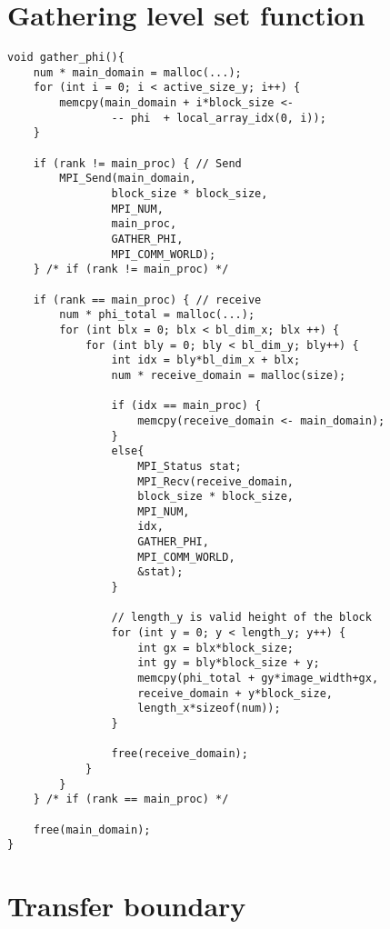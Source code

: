\section{Gathering level set function}
\label{apdx:gatherphi}
\begin{lstlisting}[caption=Gather phi]
void gather_phi(){
    num * main_domain = malloc(...);
    for (int i = 0; i < active_size_y; i++) {
        memcpy(main_domain + i*block_size <- 
                -- phi  + local_array_idx(0, i));
    }
    
    if (rank != main_proc) { // Send
        MPI_Send(main_domain,
                block_size * block_size,
                MPI_NUM,
                main_proc,
                GATHER_PHI,
                MPI_COMM_WORLD);
    } /* if (rank != main_proc) */
    
    if (rank == main_proc) { // receive
        num * phi_total = malloc(...);
        for (int blx = 0; blx < bl_dim_x; blx ++) {
            for (int bly = 0; bly < bl_dim_y; bly++) {
                int idx = bly*bl_dim_x + blx;
                num * receive_domain = malloc(size);
                
                if (idx == main_proc) {
                    memcpy(receive_domain <- main_domain);
                }
                else{
                    MPI_Status stat;
                    MPI_Recv(receive_domain,
                    block_size * block_size,
                    MPI_NUM,
                    idx,
                    GATHER_PHI,
                    MPI_COMM_WORLD,
                    &stat);
                }
                
                // length_y is valid height of the block
                for (int y = 0; y < length_y; y++) {
                    int gx = blx*block_size;
                    int gy = bly*block_size + y;
                    memcpy(phi_total + gy*image_width+gx,
                    receive_domain + y*block_size,
                    length_x*sizeof(num));
                }
                
                free(receive_domain);
            }
        }
    } /* if (rank == main_proc) */
    
    free(main_domain);
}
\end{lstlisting}

\section{Transfer boundary}
\label{apdx:tranbound}

